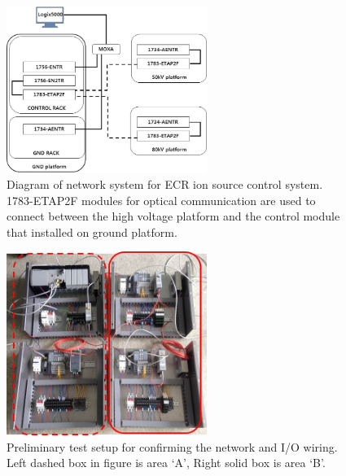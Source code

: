 \documentclass[a4paper,
              ]{jacow}
\begin{document}
\begin{figure}[!htb]
	\centering
	\includegraphics*[width=65mm]{ECR_NETWORK}
	\caption{Diagram of network system for ECR ion source control system. 1783-ETAP2F modules for optical communication are used to connect between the high voltage platform and the control module that installed on ground platform.}
\end{figure}


\begin{figure}[!htb]
	\centering
	\includegraphics*[width=65mm]{NET_TEST11}
	\caption{Preliminary test setup for confirming the network and I/O wiring. Left dashed box in figure is area ‘A’, Right solid box is area ‘B’.}
\end{figure}
\end{document}
